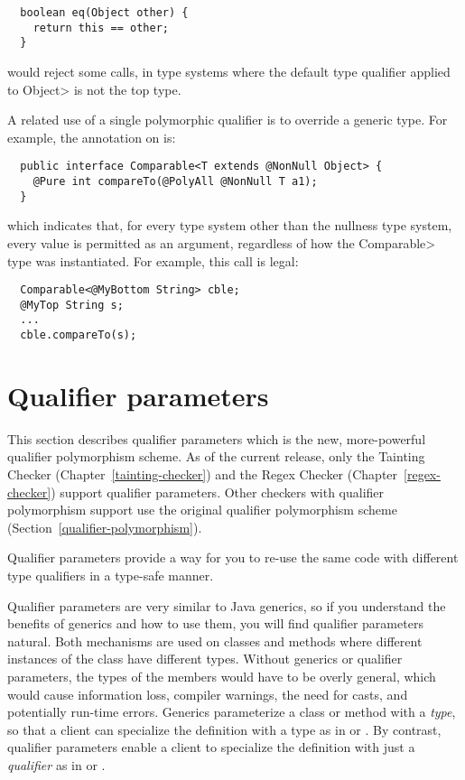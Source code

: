 \begin{Verbatim}
  boolean eq(Object other) {
    return this == other;
  }
\end{Verbatim}

\noindent
would reject some calls, in type systems where the default type qualifier
applied to \<Object> is not the top type.

A related use of a single polymorphic qualifier is to override a generic
type.  For example, the annotation on 
is:

\begin{Verbatim}
  public interface Comparable<T extends @NonNull Object> {
    @Pure int compareTo(@PolyAll @NonNull T a1);
  }
\end{Verbatim}

\noindent
which indicates that, for every type system other than the nullness type
system, every value is permitted as an argument, regardless of how the
\<Comparable> type was instantiated.  For example, this call is legal:

\begin{Verbatim}
  Comparable<@MyBottom String> cble;
  @MyTop String s;
  ...
  cble.compareTo(s);
\end{Verbatim}


\section{Qualifier parameters\label{qualifier-parameters}}

This section describes qualifier parameters which is the new, more-powerful
qualifier polymorphism scheme.
As of the current release,
only the
Tainting Checker (Chapter~\ref{tainting-checker}) and the Regex Checker
(Chapter~\ref{regex-checker}) support qualifier parameters.
Other checkers with
qualifier polymorphism support use the original qualifier polymorphism scheme
(Section~\ref{qualifier-polymorphism}).

Qualifier parameters provide a way for you to re-use the same code with
different type qualifiers in a type-safe manner.

Qualifier parameters are very similar to Java generics, so if you understand the
benefits of generics and how to use them, you will find qualifier
parameters natural.  Both mechanisms are
used on classes and methods where different instances of the class have different
types.  Without generics or qualifier parameters, the types of the members would have
to be overly general, which would cause information loss, compiler
warnings, the need for casts, and potentially run-time errors.
Generics parameterize a class or method with
a \emph{type}, so that a client can specialize the definition with a type
as in  or .  By contrast, qualifier parameters
enable a client to specialize the definition with just a \emph{qualifier}
as in
 or .


